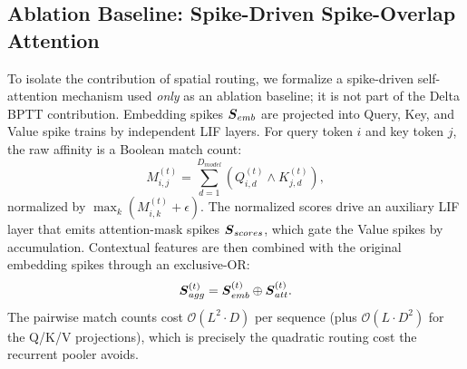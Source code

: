 \documentclass[10pt,journal,compsoc]{IEEEtran}
\begin{document}
\subsection{Ablation Baseline: Spike-Driven Spike-Overlap Attention}
To isolate the contribution of spatial routing, we formalize a spike-driven self-attention mechanism used \emph{only} as an ablation baseline; it is not part of the Delta BPTT contribution. Embedding spikes $\boldsymbol{S}_{emb}$ are projected into Query, Key, and Value spike trains by independent LIF layers. For query token $i$ and key token $j$, the raw affinity is a Boolean match count:
\begin{equation}
M_{i,j}^{(t)} = \sum_{d=1}^{D_{model}} \left( Q_{i,d}^{(t)} \wedge K_{j,d}^{(t)} \right),
\end{equation}
normalized by $\max_k (M_{i,k}^{(t)} + \epsilon)$. The normalized scores drive an auxiliary LIF layer that emits attention-mask spikes $\boldsymbol{S}_{scores}$, which gate the Value spikes by accumulation. Contextual features are then combined with the original embedding spikes through an exclusive-OR:
\begin{equation}
\boldsymbol{S}_{agg}^{(t)} = \boldsymbol{S}_{emb}^{(t)} \oplus \boldsymbol{S}_{att}^{(t)}.
\end{equation}
The pairwise match counts cost $\mathcal{O}(L^2 \cdot D)$ per sequence (plus $\mathcal{O}(L \cdot D^2)$ for the Q/K/V projections), which is precisely the quadratic routing cost the recurrent pooler avoids.
\end{document}
